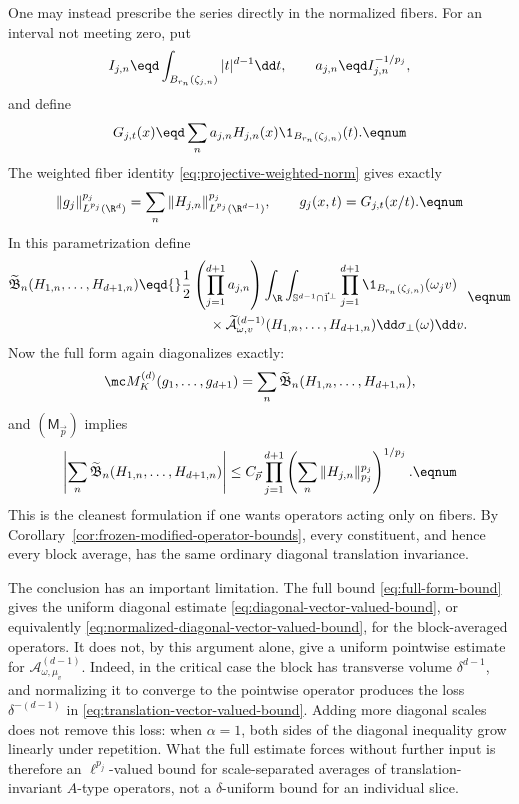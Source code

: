 One may instead prescribe the series directly in the normalized fibers.
For an interval not meeting zero, put
\[
  I_{j,n}
  \eqd
  \int_{B_{r_n}(\zeta_{j,n})}
  |t|^{d-1}\dd t,
  \qquad
  a_{j,n}\eqd I_{j,n}^{-1/p_j},
\]
and define
\[
  G_{j,t}(x)
  \eqd
  \sum_n a_{j,n}H_{j,n}(x)
  \1_{B_{r_n}(\zeta_{j,n})}(t).
  \eqnum \label{eq:normalized-fiber-series}
\]
The weighted fiber identity \eqref{eq:projective-weighted-norm} gives exactly
\[
  \|g_j\|_{L^{p_j}(\R^d)}^{p_j}
  =
  \sum_n\|H_{j,n}\|_{L^{p_j}(\R^{d-1})}^{p_j},
  \qquad
  g_j(x,t)=G_{j,t}(x/t).
  \eqnum \label{eq:normalized-fiber-series-norms}
\]
In this parametrization define
\[
\begin{aligned}
  \widetilde{\mathfrak B}_n
  (H_{1,n},\ldots,H_{d+1,n})
  \eqd{}&
  \frac12\left(\prod_{j=1}^{d+1}a_{j,n}\right)
  \int_\R\int_{\mathbb S^{d-1}\cap\vec1^\perp}
  \prod_{j=1}^{d+1}
  \1_{B_{r_n}(\zeta_{j,n})}(\omega_jv)\\
  &\qquad\times
  \widetilde{\mathcal A}_{\omega,v}^{(d-1)}
  (H_{1,n},\ldots,H_{d+1,n})
  \dd\sigma_\perp(\omega)\dd v.
\end{aligned}
\eqnum \label{eq:normalized-diagonal-block-operator}
\]
Now the full form again diagonalizes exactly:
\[
  \mc M_K^{(d)}(g_1,\ldots,g_{d+1})
  =
  \sum_n\widetilde{\mathfrak B}_n
  (H_{1,n},\ldots,H_{d+1,n}),
\]
and \((\mathsf M_{\vec p})\) implies
\[
  \left|
  \sum_n\widetilde{\mathfrak B}_n
  (H_{1,n},\ldots,H_{d+1,n})
  \right|
  \le C_{\vec p}
  \prod_{j=1}^{d+1}
  \left(
    \sum_n\|H_{j,n}\|_{p_j}^{p_j}
  \right)^{1/p_j}.
  \eqnum \label{eq:normalized-diagonal-vector-valued-bound}
\]
This is the cleanest formulation if one wants operators acting only on
fibers.  By Corollary~\ref{cor:frozen-modified-operator-bounds}, every
constituent, and hence every block average, has the same ordinary diagonal
translation invariance.

The conclusion has an important limitation.  The full bound
\eqref{eq:full-form-bound} gives the uniform diagonal estimate
\eqref{eq:diagonal-vector-valued-bound}, or equivalently
\eqref{eq:normalized-diagonal-vector-valued-bound}, for the block-averaged operators.  It does
not, by this argument alone, give a uniform pointwise estimate for
\(\mathcal A_{\omega,\mu_v}^{(d-1)}\).  Indeed, in the critical case the
block has transverse volume \(\delta^{d-1}\), and normalizing it to converge
to the pointwise operator produces the loss
\(\delta^{-(d-1)}\) in \eqref{eq:translation-vector-valued-bound}.  Adding more diagonal scales does
not remove this loss: when \(\alpha=1\), both sides of the diagonal
inequality grow linearly under repetition.  What the full estimate forces
without further input is therefore an \(\ell^{p_j}\)-valued bound for
scale-separated averages of translation-invariant \(A\)-type operators,
not a \(\delta\)-uniform bound for an individual slice.

